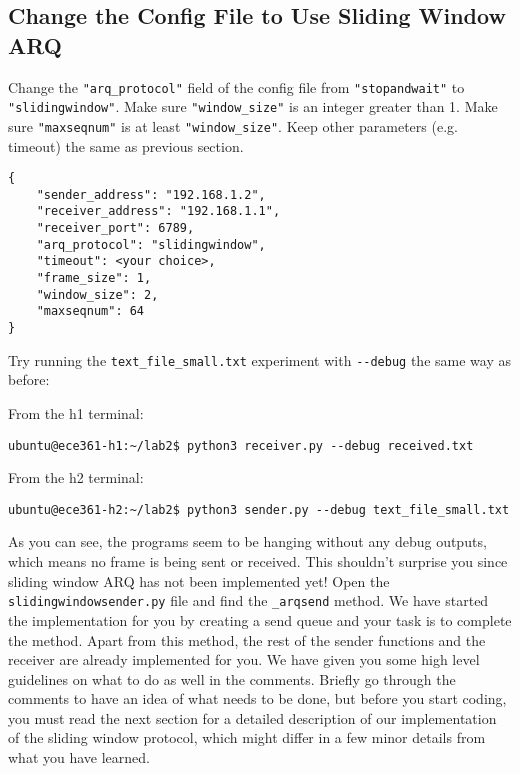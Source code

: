 \documentclass[11pt]{article}
\begin{document}
\subsection{Change the Config File to Use Sliding Window ARQ}
Change the \texttt{"arq\_protocol"} field of the config file from \texttt{"stopandwait"} to \texttt{"slidingwindow"}.
Make sure \texttt{"window\_size"} is an integer greater than 1.
Make sure \texttt{"maxseqnum"} is at least \texttt{"window\_size"}.
Keep other parameters (e.g. timeout) the same as previous section.
\begin{lstlisting}[style=ece361-shell-base, caption={Sliding Window Configuration}]
{
    "sender_address": "192.168.1.2",
    "receiver_address": "192.168.1.1",
    "receiver_port": 6789,
    "arq_protocol": "slidingwindow",
    "timeout": <your choice>,
    "frame_size": 1,
    "window_size": 2,
    "maxseqnum": 64
}
\end{lstlisting}


Try running the \texttt{text\_file\_small.txt} experiment with \texttt{-{}-debug} the same way as before:

\noindent From the h1 terminal:
\begin{lstlisting}[style=ece361-shell-base, caption={}]
ubuntu@ece361-h1:~/lab2$ python3 receiver.py --debug received.txt
\end{lstlisting}

From the h2 terminal:
\begin{lstlisting}[style=ece361-shell-base, caption={}]
ubuntu@ece361-h2:~/lab2$ python3 sender.py --debug text_file_small.txt
\end{lstlisting}

As you can see, the programs seem to be hanging without any debug outputs, which means no frame is being sent or received.
This shouldn't surprise you since sliding window ARQ has not been implemented yet!
Open the \texttt{slidingwindowsender.py} file and find the \texttt{\_arqsend} method.
We have started the implementation for you by creating a send queue and your task is to complete the method.
Apart from this method, the rest of the sender functions and the receiver are already implemented for you.
We have given you some high level guidelines on what to do as well in the comments.
Briefly go through the comments to have an idea of what needs to be done, but before you start coding, you must read the next section for a detailed description of our implementation of the sliding window protocol, which might differ in a few minor details from what you have learned.
\end{document}
